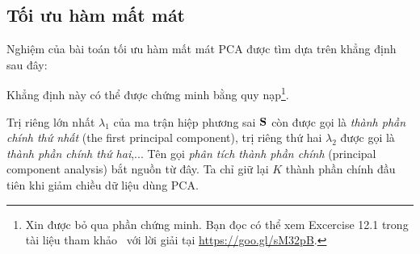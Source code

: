 \subsection{Tối ưu hàm mất mát}
Nghiệm của bài toán tối ưu hàm mất mát PCA được tìm dựa trên khẳng định sau
đây:


Khẳng định này có thể được chứng minh bằng quy nạp\footnote{Xin được bỏ qua
phần chứng minh. Bạn đọc có thể xem Excercise 12.1 trong tài liệu tham
khảo~\cite{bishop2006pattern} với lời giải tại \url{https://goo.gl/sM32pB}.}.

Trị riêng lớn nhất $\lambda_1$ của ma trận hiệp phương sai $\mathbf{S}$ còn được gọi
là \textit{thành
phần chính thứ nhất} ({the first principal component}), trị riêng thứ hai
$\lambda_2$ được gọi là \textit{thành phần chính thứ hai},... Tên gọi
\textit{phân tích thành phần chính} ({principal component analysis}) bắt
nguồn từ đây. Ta chỉ giữ lại $K$ thành phần chính đầu tiên khi giảm chiều dữ
liệu dùng PCA.

